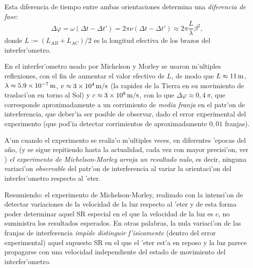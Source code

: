Esta diferencia de tiempo entre ambas orientaciones determina una \textit{diferencia de fase}:
\begin{equation}
\Delta\varphi=\omega(\Delta t-\Delta t')=2\pi\nu(\Delta t-\Delta t')\approx2\pi\frac{L}{\lambda} \beta^2,
\end{equation}
donde $L:=(L_{AB}+L_{AC})/2$ es la longitud efectiva de los brazos del interfer'ometro.

En el interfer'ometro usado por Michelson y Morley se usaron m'ultiples reflexiones, con el fin de aumentar el valor efectivo de $L$, de modo que $L\approx 11\,\rm m$, $\lambda\approx 5.9\times 10^{-7}\,\rm m$, $v\approx 3\times 10^4\,\rm m/s$ (la rapidez de la Tierra en su movimiento de traslaci'on en torno al Sol) y $c \approx 3\times 10^{8}\,\rm m/s$, con lo que $\Delta\varphi \approx 0,4\,\pi$, que corresponde aproximadamente a un corrimiento de \textit{media franja} en el patr'on de interferencia, que deber'ia ser posible de observar, dado el error experimental del experimento (que pod'ia detectar corrimientos de aproximadamente $0,01$ franjas).

A'un cuando el experimento se realiz'o m'ultiples veces, en diferentes 'epocas del a\~no, (y se sigue repitiendo hasta la actualidad, cada vez con mayor precisi'on, ver \cite{MHBSP03}) \textit{el experimento de Michelson-Morley arroja un resultado nulo}, es decir, ninguna variaci'on \textit{observable} del patr'on de interferencia al variar la orientaci'on del interfer'ometro respecto al 'eter.

Resumiendo: el experimento de Michelson-Morley, realizado con la intensi'on de detectar variaciones de la velocidad de la luz respecto al 'eter y de esta forma poder determinar aquel SR especial en el que la velocidad de la luz es $c$, no suministra los resultados esperados. En otras palabras, la nula variaci'on de las franjas de interferencia \textit{impide distinguir f'isicamente }(dentro del error experimental) aquel supuesto SR en el que el 'eter est'a en reposo y la luz parece propagarse con una velocidad independiente del estado de movimiento del interfer'ometro.

